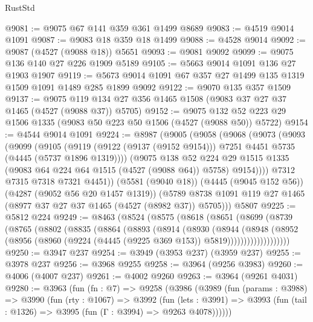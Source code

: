 \begin{lexlean}{RustStd}
\begin{coremodule}
{\begin{coremodule}
{{{{{{{{{{{{{{{{{{{{{{{{{{{{{{{{{{{{{{@9081 := @9075 @67 @141 @359 @361 @1499 @8689
@9083 := @4519 @9014 @1091
@9087 := @9083 @18 @359 @18 @1499
@9088 := @4528 @9014
@9092 := @9087 (@4527 (@9088 @18)) @5651
@9093 := @9081 @9092
@9099 := @9075 @136 @140 @27 @226 @1909 @5189
@9105 := @5663 @9014 @1091 @136 @27 @1903 @1907
@9119 := @5673 @9014 @1091 @67 @357 @27 @1499 @135 @1319 @1509 @1091 @1489 @285 @1899 @9092
@9122 := @9070 @135 @357 @1509
@9137 := @9075 @119 @134 @27 @356 @1465 @1508 (@9083 @37 @27 @37 @1465 (@4527 (@9088 @37)) @5705)
@9152 := @9075 @132 @52 @223 @29 @1506 @1335 (@9083 @50 @223 @50 @1506 (@4527 (@9088 @50)) @5722)
@9154 := @4544 @9014 @1091
@9224 := @8987
    (@9005
      (@9058
        (@9068
          (@9073
            (@9093
              (@9099
                (@9105
                  (@9119
                    (@9122 (@9137 (@9152 @9154)))
                    @7251
                    @4451
                    @5735
                    (@4445 (@5737 @1896 @1319))))
                (@9075
                  @138
                  @52
                  @224
                  @29
                  @1515
                  @1335
                  (@9083 @64 @224 @64 @1515 (@4527 (@9088 @64)) @5758)
                  @9154))))
          @7312
          @7315
          @7318
          @7321
          @4451))
      (@5581 (@9040 @18))
      (@4445 (@9045 @152 @56))
      (@4287 (@9052 @56 @20 @1457 @1319))
      (@5789 @8738 @1091 @119 @27 @1465 (@8977 @37 @27 @37 @1465 (@4527 (@8982 @37)) @5705)))
    @5807
@9225 := @5812 @224
@9249 := @8463
    (@8524
      (@8575
        (@8618
          (@8651
            (@8699
              (@8739
                (@8765
                  (@8802
                    (@8835
                      (@8864
                        (@8893
                          (@8914
                            (@8930
                              (@8944
                                (@8948
                                  (@8952
                                    (@8956
                                      (@8960
                                        (@9224 (@4445 (@9225 @369 @153)) @5819)))))))))))))))))))
@9250 := @3947 @237
@9254 := @3949 (@3953 @237) (@3959 @237)
@9255 := @3978 @237
@9256 := @3968 @9255
@9258 := @3964 (@9256 @3983)
@9260 := @4006 (@4007 @237)
@9261 := @4002 @9260
@9263 := @3964 (@9261 @4031)
@9280 := @3963
    (fun (fn : @7) =>
    @9258
      (@3986
        (@3989
          (fun (params : @3988) =>
          @3990
            (fun (rty : @1067) =>
            @3992
              (fun (lets : @3991) =>
              @3993 (fun (tail : @1326) => @3995 (fun (Γ : @3994) => @9263 @4078))))))
}}}}}}}}}}}}}}}}}}}}}}}}}}}}}}}}}}}}}}
\end{coremodule}}
\end{coremodule}
\end{lexlean}
